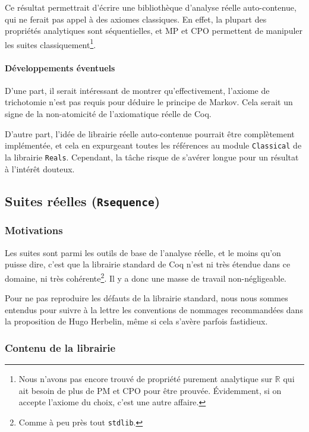 \documentclass[a4paper,10pt]{article}
\newcommand{\coqcode}[1]{\texttt{#1}}
\begin{document}
Ce résultat permettrait d'écrire une bibliothèque d'analyse réelle auto-contenue, qui ne ferait pas appel à des axiomes classiques. En effet, la plupart des propriétés analytiques sont séquentielles, et MP et CPO permettent de manipuler les suites classiquement\footnote{Nous n'avons pas encore trouvé de propriété purement analytique sur $\mathbb{R}$ qui ait besoin de plus de PM et CPO pour être prouvée. Évidemment, si on accepte l'axiome du choix, c'est une autre affaire.}.

\paragraph{Développements éventuels}

D'une part, il serait intéressant de montrer qu'effectivement, l'axiome de trichotomie n'est pas requis pour déduire le principe de Markov. Cela serait un signe de la non-atomicité de l'axiomatique réelle de Coq.

D'autre part, l'idée de librairie réelle auto-contenue pourrait être complètement implémentée, et cela en expurgeant toutes les références au module \coqcode{Classical} de la librairie \coqcode{Reals}. Cependant, la tâche risque de s'avérer longue pour un résultat à l'intérêt douteux.


\subsection{Suites réelles (\coqcode{Rsequence})}

\subsubsection{Motivations}

Les suites sont parmi les outils de base de l'analyse réelle, et le moins qu'on puisse dire, c'est que la librairie standard de Coq n'est ni très étendue dans ce domaine, ni très cohérente\footnote{Comme à peu près tout \coqcode{stdlib}.}. Il y a donc une masse de travail non-négligeable.

Pour ne pas reproduire les défauts de la librairie standard, nous nous sommes entendus pour suivre à la lettre les conventions de nommages recommandées dans la proposition de Hugo Herbelin, même si cela s'avère parfois fastidieux.

\subsubsection{Contenu de la librairie}
\end{document}
